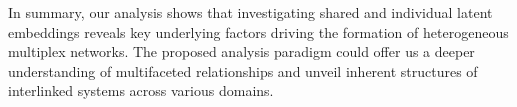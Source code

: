 \documentclass[12pt]{article}
\begin{document}
In summary, our analysis shows that investigating shared and individual latent embeddings  reveals key underlying factors driving the formation of heterogeneous multiplex networks. 
The proposed analysis paradigm could offer us a deeper understanding of multifaceted relationships and unveil  inherent structures of interlinked systems across various domains.  







\end{document}
